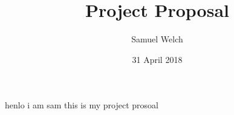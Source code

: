 \documentclass[11pt]{article}
\title{Project Proposal}
\author{Samuel Welch}
\date{31 April 2018}
\begin{document}
\sffamily
henlo i am sam this is my project prosoal
\end{document}
